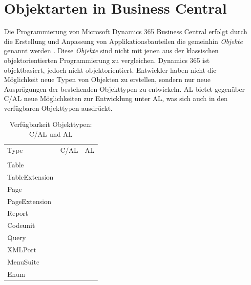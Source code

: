 %



\pagebreak
\section{Objektarten in Business Central}
\label{sec:Objektarten in Business Central}

Die Programmierung von Microsoft Dynamics 365 Business Central erfolgt durch die Erstellung und Anpassung von Applikationsbauteilen die gemeinhin \textit{Objekte} genannt werden \cite{msdnDesigningApplicationObjects}. Diese \textit{Objekte} sind nicht mit jenen aus der klassischen objektorientierten Programmierung zu vergleichen. Dynamics 365 ist objektbasiert, jedoch nicht objektorientiert. Entwickler haben nicht die Möglichkeit neue Typen von Objekten zu erstellen, sondern nur neue Ausprägungen der bestehenden Objekttypen zu entwickeln. AL bietet gegenüber C/AL neue Möglichkeiten zur Entwicklung unter AL, was sich auch in den verfügbaren Objekttypen ausdrückt.


\begin{table}[htb]
	\centering
	\begin{tabular}{lll}
		Type           & C/AL & AL \\ 
		\\
		Table          & \cmark    & \cmark  \\
		TableExtension & \xmark    & \cmark  \\
		Page           & \cmark    & \cmark  \\
		PageExtension  & \xmark    & \cmark  \\
		Report         & \cmark    & \cmark  \\
		Codeunit       & \cmark    & \cmark  \\
		Query          & \cmark    & \cmark  \\
		XMLPort        & \cmark    & \cmark  \\
		MenuSuite      & \cmark    & \xmark  \\
		Enum           & \xmark    & \cmark  \\
	\end{tabular}
\caption{Verfügbarkeit Objekttypen: C/AL und AL}
\end{table}

